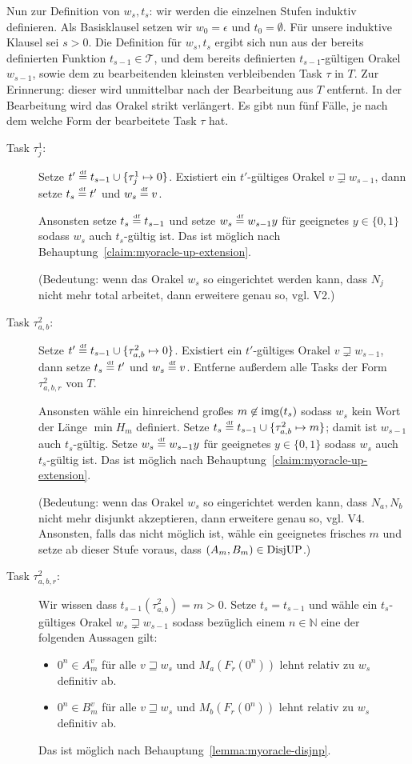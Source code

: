 Nun zur Definition von $w_s, t_s$: wir werden die einzelnen Stufen induktiv definieren. Als Basisklausel setzen wir $w_0 = \epsilon$ und $t_0 = \emptyset$.
Für unsere induktive Klausel sei $s>0$. Die Definition für $w_s, t_s$ ergibt sich nun aus der bereits definierten Funktion $t_{s-1}\in\mathcal T$, und dem bereits definierten $t_{s-1}$-gültigen Orakel $w_{s-1}$, sowie dem zu bearbeitenden kleinsten verbleibenden Task $\tau$ in $T$.
Zur Erinnerung: dieser wird unmittelbar nach der Bearbeitung aus $T$ entfernt. In der Bearbeitung wird das Orakel strikt verlängert.
Es gibt nun fünf Fälle, je nach dem welche Form der bearbeitete Task $\tau$ hat.
\begin{description}
    \item[Task $\tau^1_j$:] Setze $t'\stackrel{\text{\smash{\tiny df}}}{=} t_{s-1}\cup\{\tau^1_j\mapsto 0\}$. Existiert ein $t'$-gültiges Orakel $v\sqsupsetneq w_{s-1}$, dann setze $t_s\stackrel{\text{\smash{\tiny df}}}{=} t'$ und $w_s\stackrel{\text{\smash{\tiny df}}}{=} v$.

        Ansonsten setze $t_s\stackrel{\text{\smash{\tiny df}}}{=} t_{s-1}$ und setze $w_s\stackrel{\text{\smash{\tiny df}}}{=} w_{s-1}y$ für geeignetes $y\in\{0,1\}$ sodass $w_s$ auch $t_s$-gültig ist. Das ist möglich nach Behauptung~\ref{claim:myoracle-up-extension}.

        (Bedeutung: wenn das Orakel $w_s$ so eingerichtet werden kann, dass $N_j$ nicht mehr total arbeitet, dann erweitere genau so, vgl. V2.) 

    \item[Task $\tau^2_{a,b}$:] Setze $t'\stackrel{\text{\smash{\tiny df}}}{=} t_{s-1}\cup\{\tau^2_{a,b}\mapsto 0\}$. Existiert ein $t'$-gültiges Orakel $v\sqsupsetneq w_{s-1}$, dann setze $t_s\stackrel{\text{\smash{\tiny df}}}{=} t'$ und $w_s\stackrel{\text{\smash{\tiny df}}}{=} v$. Entferne außerdem alle Tasks der Form $\tau^2_{a,b,r}$ von $T$.

        Ansonsten wähle ein hinreichend großes $m\not\in \operatorname{img}(t_s)$ sodass $w_s$ kein Wort der Länge $\min H_m$ definiert. Setze $t_s\stackrel{\text{\smash{\tiny df}}}{=} t_{s-1}\cup \{ \tau^2_{a,b}\mapsto m \}$; damit ist $w_{s-1}$ auch $t_s$-gültig. Setze $w_s\stackrel{\text{\smash{\tiny df}}}{=} w_{s-1}y$ für geeignetes $y\in\{0,1\}$ sodass $w_s$ auch $t_s$-gültig ist. Das ist möglich nach Behauptung~\ref{claim:myoracle-up-extension}.

        (Bedeutung: wenn das Orakel $w_s$ so eingerichtet werden kann, dass $N_a, N_b$ nicht mehr disjunkt akzeptieren, dann erweitere genau so, vgl. V4. Ansonsten, falls das nicht möglich ist, wähle ein geeignetes frisches $m$ und setze ab dieser Stufe voraus, dass $(A_m, B_m)\in \mathrm{DisjUP}$.) 

    \item[Task $\tau^2_{a,b,r}$:] Wir wissen dass $t_{s-1}(\tau^2_{a,b})=m>0$. Setze $t_s=t_{s-1}$ und wähle ein $t_s$-gültiges Orakel $w_s\sqsupsetneq w_{s-1}$ sodass bezüglich einem $n\in\mathbb N$ eine der folgenden Aussagen gilt:
        \begin{itemize}[nosep,endpenalty=10000]
            \item $0^n\in A_m^v$ für alle $v\sqsupseteq w_s$ und $M_a(F_r(0^n))$ lehnt relativ zu $w_s$ definitiv ab.
            \item $0^n\in B_m^v$ für alle $v\sqsupseteq w_s$ und $M_b(F_r(0^n))$ lehnt relativ zu $w_s$ definitiv ab.
        \end{itemize} Das ist möglich nach Behauptung~\ref{lemma:myoracle-disjnp}.


\end{description}
